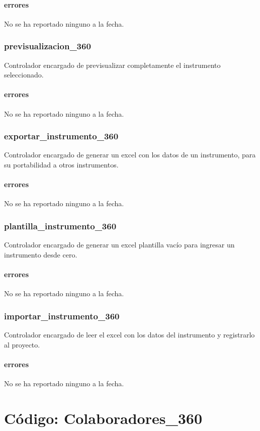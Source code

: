 \documentclass[10pt,a4paper]{book}
\begin{document}
	\subsubsection{errores}
	No se ha reportado ninguno a la fecha.
	
	\subsection{previsualizacion\_360}
	Controlador encargado de previsualizar completamente el instrumento seleccionado.
	\subsubsection{errores}
	No se ha reportado ninguno a la fecha.
	
	\subsection{exportar\_instrumento\_360}
	Controlador encargado de generar un excel con los datos de un instrumento, para su portabilidad a otros instrumentos.
	\subsubsection{errores}
	No se ha reportado ninguno a la fecha.
	
	\subsection{plantilla\_instrumento\_360}
	Controlador encargado de generar un excel plantilla vacío para ingresar un instrumento desde cero.
	\subsubsection{errores}
	No se ha reportado ninguno a la fecha.
	
	\subsection{importar\_instrumento\_360}
	Controlador encargado de leer el excel con los datos del instrumento y registrarlo al proyecto.
	\subsubsection{errores}
	No se ha reportado ninguno a la fecha.


	\chapter{Código: Colaboradores\_360}
	
\end{document}
